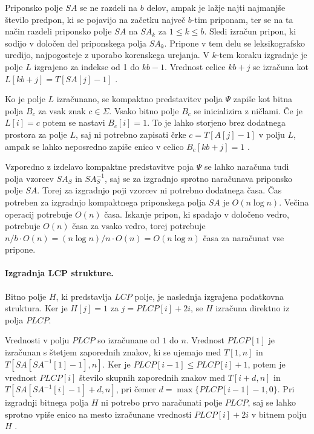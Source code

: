Priponsko polje $SA$ se ne razdeli na $b$ delov, ampak je lažje najti najmanjše število predpon, ki se pojavijo na začetku največ $b$-tim priponam, ter se na ta način razdeli priponsko polje $SA$ na $SA_k$ za $1\le k\le b$. Sledi izračun pripon, ki sodijo v določen del priponskega polja $SA_k$. Pripone v tem delu se leksikografsko uredijo, najpogosteje z uporabo korenskega urejanja. V $k$-tem koraku izgradnje je polje $L$ izgrajeno za indekse od 1 do $kb-1$. Vrednost celice $kb+j$ se izračuna kot $L[kb+j]=T[SA[j]-1]$ \cite{Navarro2016}.

Ko je polje $L$ izračunano, se kompaktno predstavitev polja $\Psi$ zapiše kot bitna polja $B_c$ za vsak znak $c\in \Sigma$. Vsako bitno polje $B_c$ se inicializira z ničlami. Če je $L[i]=c$ potem se nastavi $B_c[i]=1$. To je lahko storjeno brez dodatnega prostora za polje $L$, saj ni potrebno zapisati črke $c=T[A[j]-1]$ v polju $L$, ampak se lahko neposredno zapiše enico v celico $B_c[kb+j]=1$ \cite{Navarro2016}.

Vzporedno z izdelavo kompaktne predstavitve poja $\Psi$ se lahko naračuna tudi polja vzorcev $SA_S$ in $SA_S^{-1}$, saj se za izgradnjo sprotno naračunava priponsko polje $SA$. Torej za izgradnjo poji vzorcev ni potrebno dodatnega časa. Čas potreben za izgradnjo kompaktnega priponskega polja $SA$ je $O(n\log{n})$. Večina operacij potrebuje $O(n)$ časa. Iskanje pripon, ki spadajo v določeno vedro, potrebuje $O(n)$ časa za vsako vedro, torej potrebuje $n/b\cdot O(n)=(n\log{n})/n\cdot O(n)=O(n\log{n})$ časa za naračunat vse pripone. 

\paragraph{Izgradnja LCP strukture.}
Bitno polje $H$, ki predstavlja $LCP$ polje, je naslednja izgrajena podatkovna struktura. Ker je $H[j]=1$ za $j=PLCP[i]+2i$, se $H$ izračuna direktno iz polja $PLCP$.

Vrednosti v polju $PLCP$ so izračunane od $1$ do $n$. Vrednost $PLCP[1]$ je izračunan s štetjem zaporednih znakov, ki se ujemajo med $T[1,n]$ in $T[SA[SA^{-1}[1]-1],n]$. Ker je $PLCP[i-1]\le PLCP[i]+1$, potem je vrednost $PLCP[i]$ število skupnih zaporednih znakov med $T[i+d,n]$ in $T[SA[SA^{-1}[i]-1]+d,n]$, pri čemer $d=\max\{PLCP[i-1]-1,0\}$.
Pri izgradnji bitnega polja $H$ ni potrebo prvo naračunati polje $PLCP$, saj se lahko sprotno vpiše enico na mesto izračunane vrednosti $PLCP[i]+2i$ v bitnem polju $H$ \cite{Navarro2016}.

